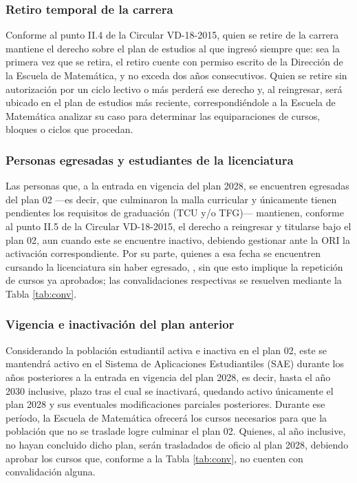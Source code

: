 \subsubsection{Retiro temporal de la carrera}
Conforme al punto II.4 de la Circular VD-18-2015, quien se retire de la carrera mantiene el derecho sobre el plan de estudios al que ingresó siempre que: sea la primera vez que se retira, el retiro cuente con permiso escrito de la Dirección de la Escuela de Matemática, y no exceda dos años consecutivos. Quien se retire sin autorización por un ciclo lectivo o más perderá ese derecho y, al reingresar, será ubicado en el plan de estudios más reciente, correspondiéndole a la Escuela de Matemática analizar su caso para determinar las equiparaciones de cursos, bloques o ciclos que procedan.

\subsubsection{Personas egresadas y estudiantes de la licenciatura}
Las personas que, a la entrada en vigencia del plan 2028, se encuentren egresadas del plan 02 —es decir, que culminaron la malla curricular y únicamente tienen pendientes los requisitos de graduación (TCU y/o TFG)— mantienen, conforme al punto II.5 de la Circular VD-18-2015, el derecho a reingresar y titularse bajo el plan 02, aun cuando este se encuentre inactivo, debiendo gestionar ante la ORI la activación correspondiente. Por su parte, quienes a esa fecha se encuentren cursando la licenciatura sin haber egresado, , sin que esto implique la repetición de cursos ya aprobados; las convalidaciones respectivas se resuelven mediante la Tabla \ref{tab:conv}.

\subsubsection{Vigencia e inactivación del plan anterior}
Considerando la población estudiantil activa e inactiva en el plan 02, este se mantendrá activo en el Sistema de Aplicaciones Estudiantiles (SAE) durante los  años posteriores a la entrada en vigencia del plan 2028, es decir, hasta el año 2030 inclusive, plazo tras el cual se inactivará, quedando activo únicamente el plan 2028 y sus eventuales modificaciones parciales posteriores. Durante ese período, la Escuela de Matemática ofrecerá los cursos necesarios para que la población que no se traslade logre culminar el plan 02. Quienes, al año  inclusive, no hayan concluido dicho plan, serán trasladados de oficio al plan 2028, debiendo aprobar los cursos que, conforme a la Tabla \ref{tab:conv}, no cuenten con convalidación alguna. 

